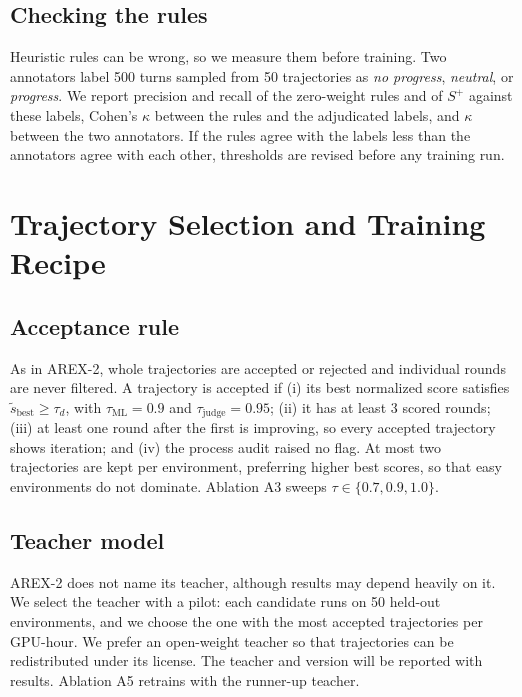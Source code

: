 \documentclass[11pt]{article}
\newcommand{\stilde}{\tilde{s}}
\newcommand{\splus}{S^{+}}
\begin{document}
\subsection{Checking the rules}
Heuristic rules can be wrong, so we measure them before training. Two annotators label 500 turns sampled from 50 trajectories as \emph{no progress}, \emph{neutral}, or \emph{progress}. We report precision and recall of the zero-weight rules and of $\splus$ against these labels, Cohen's $\kappa$ between the rules and the adjudicated labels, and $\kappa$ between the two annotators. If the rules agree with the labels less than the annotators agree with each other, thresholds are revised before any training run.

\section{Trajectory Selection and Training Recipe}
\label{sec:recipe}

\subsection{Acceptance rule}
\label{sec:accept}
As in AREX-2, whole trajectories are accepted or rejected and individual rounds are never filtered. A trajectory is accepted if (i) its best normalized score satisfies $\stilde_{\text{best}} \ge \tau_d$, with $\tau_{\text{ML}} = 0.9$ and $\tau_{\text{judge}} = 0.95$; (ii) it has at least 3 scored rounds; (iii) at least one round after the first is improving, so every accepted trajectory shows iteration; and (iv) the process audit raised no flag. At most two trajectories are kept per environment, preferring higher best scores, so that easy environments do not dominate. Ablation A3 sweeps $\tau \in \{0.7, 0.9, 1.0\}$.

\subsection{Teacher model}
\label{sec:teacher}
AREX-2 does not name its teacher, although results may depend heavily on it. We select the teacher with a pilot: each candidate runs on 50 held-out environments, and we choose the one with the most accepted trajectories per GPU-hour. We prefer an open-weight teacher so that trajectories can be redistributed under its license. The teacher and version will be reported with results. Ablation A5 retrains with the runner-up teacher.
\end{document}
